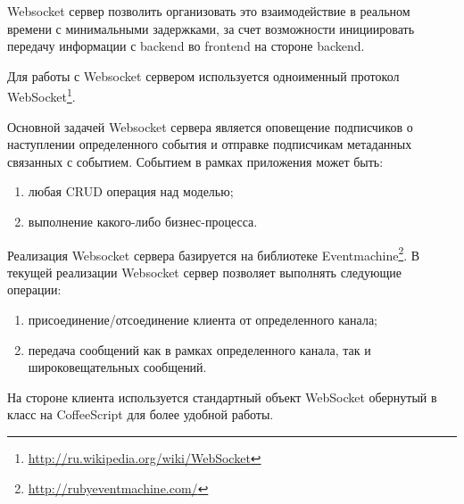 Websocket сервер позволить организовать это взаимодействие в реальном времени с
минимальными задержками, за счет возможности инициировать передачу информации с
backend во frontend на стороне backend.
	
Для работы с Websocket сервером используется одноименный протокол WebSocket\footnote{
	\url{http://ru.wikipedia.org/wiki/WebSocket}
}.

Основной задачей Websocket сервера является оповещение подписчиков о наступлении
определенного события и отправке подписчикам метаданных связанных с событием.
Событием в рамках приложения может быть:
\begin{enumerate}
  \item любая CRUD операция над моделью;
  \item выполнение какого-либо бизнес-процесса.
\end{enumerate}

Реализация Websocket сервера базируется на библиотеке Eventmachine\footnote{
	\url{http://rubyeventmachine.com/}
}. В текущей реализации Websocket сервер позволяет выполнять следующие операции:
\begin{enumerate}
  \item присоединение/отсоединение клиента от определенного канала;
  \item передача сообщений как в рамках определенного канала, так и
широковещательных сообщений.
\end{enumerate}

На стороне клиента используется стандартный объект WebSocket обернутый в класс
на CoffeeScript для более удобной работы.
